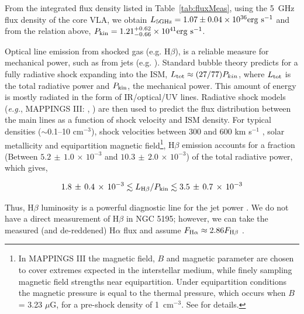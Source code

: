 \documentclass[fleqn,usenatbib]{mnras}
\def\tab{Table}
\begin{document}
From the integrated flux density listed in \tab~\ref{tab:fluxMeas}, using the 5~GHz flux density of the core VLA, we obtain  
$L_{5 \rm GHz} = 1.07 \pm 0.04 \times 10^{36} {\rm erg~s^{-1}}$ and from the relation above, $P_{\rm 
kin} = 1.21^{+0.62}_{-0.66} \times 10^{41} {\rm erg~s^{-1}}$. 

Optical line emission from shocked gas (e.g. H$\beta$), is a reliable measure for mechanical power, 
such as from jets (e.g. \citealt{DopitaSutherland1996,Allenetal2008}). Standard bubble theory \citep{Weaver+1977} predicts for a fully radiative shock expanding into the ISM, {$L_{\rm tot} \approx (27/77)P_{kin}$, where  $L_{\rm tot}$ is the total radiative power and $P_{\rm kin}$, the mechanical power.}
This amount of energy is mostly radiated in the form of IR/optical/UV lines. Radiative shock models ({\it e.g.}, 
{\small {MAPPINGS III}}: \citealt{DopitaSutherland1996}, \citealt{Allenetal2008}) are then used to 
predict the flux distribution between the main lines as a function of shock velocity and ISM density. 
For typical densities ($\sim$0.1--10 cm$^{-3}$), shock velocities between 300 and 600 km s$^{-1}$ \citep{SJMV}, 
solar metallicity and equipartition magnetic field\footnote{{In MAPPINGS III the magnetic field, $B$ and magnetic parameter are chosen to cover extremes expected in the interstellar medium, 
while finely sampling magnetic field strengths near equipartition. Under equipartition conditions the magnetic 
pressure is equal to the thermal pressure, which occurs when $B$ = 3.23 $\mu$G, for a pre-shock 
density of 1~cm$^{-3}$. See \citealt{Allenetal2008} for details.}}, {H$\beta$ emission accounts for a 
fraction (Between $ 5.2\, \pm\, 1.0\, \times\, 10^{-3}$ and $10.3\, \pm\, 2.0\, \times\, 10^{-3}$) of the total radiative power, which gives, }

\begin{equation}
1.8\, \pm\, 0.4\, \times\, 10^{-3}  \lesssim L_{\rm{H}\beta}/P_{\rm kin} \lesssim 3.5\, \pm\, 0.7\, \times\, 10^{-3}  
\label{eq:hbeta_jet}
\end{equation}


 Thus, H$\beta$ luminosity is a powerful diagnostic line for the 
jet power \citep{Pakull+2010}. We do not have a direct measurement of H$\beta$ in NGC 5195; however, 
we can take the measured (and de-reddened) H$\alpha$ flux and assume $F_{{\rm{H}}\alpha} \approx 
2.86F_{{\rm{H}}\beta}$ \citep{OF2006}.
\end{document}
